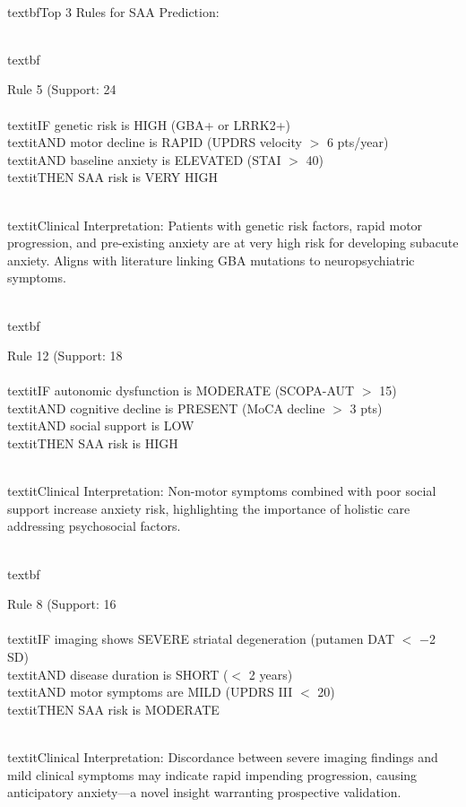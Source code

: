 \documentclass[conference]{IEEEtran}
\begin{document}
\\textbf{Top 3 Rules for SAA Prediction:}

\\textbf{Rule 5 (Support: 24\\%

\\textit{IF} genetic risk is HIGH (GBA+ or LRRK2+) \\textit{AND} motor decline is RAPID (UPDRS velocity $>$ 6 pts/year) \\textit{AND} baseline anxiety is ELEVATED (STAI $>$ 40) \\textit{THEN} SAA risk is VERY HIGH

\\textit{Clinical Interpretation:} Patients with genetic risk factors, rapid motor progression, and pre-existing anxiety are at very high risk for developing subacute anxiety. Aligns with literature linking GBA mutations to neuropsychiatric symptoms.

\\textbf{Rule 12 (Support: 18\\%

\\textit{IF} autonomic dysfunction is MODERATE (SCOPA-AUT $>$ 15) \\textit{AND} cognitive decline is PRESENT (MoCA decline $>$ 3 pts) \\textit{AND} social support is LOW \\textit{THEN} SAA risk is HIGH

\\textit{Clinical Interpretation:} Non-motor symptoms combined with poor social support increase anxiety risk, highlighting the importance of holistic care addressing psychosocial factors.

\\textbf{Rule 8 (Support: 16\\%

\\textit{IF} imaging shows SEVERE striatal degeneration (putamen DAT $<$ −2 SD) \\textit{AND} disease duration is SHORT ($<$ 2 years) \\textit{AND} motor symptoms are MILD (UPDRS III $<$ 20) \\textit{THEN} SAA risk is MODERATE

\\textit{Clinical Interpretation:} Discordance between severe imaging findings and mild clinical symptoms may indicate rapid impending progression, causing anticipatory anxiety—a novel insight warranting prospective validation.

}}}
\end{document}
